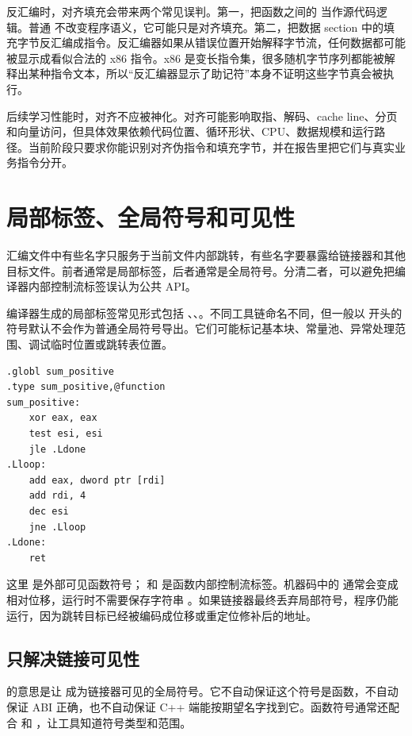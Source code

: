反汇编时，对齐填充会带来两个常见误判。第一，把函数之间的  当作源代码逻辑。普通  不改变程序语义，它可能只是对齐填充。第二，把数据 section 中的填充字节反汇编成指令。反汇编器如果从错误位置开始解释字节流，任何数据都可能被显示成看似合法的 x86 指令。x86 是变长指令集，很多随机字节序列都能被解释出某种指令文本，所以“反汇编器显示了助记符”本身不证明这些字节真会被执行。

\begin{deepdive}
后续学习性能时，对齐不应被神化。对齐可能影响取指、解码、cache line、分页和向量访问，但具体效果依赖代码位置、循环形状、CPU、数据规模和运行路径。当前阶段只要求你能识别对齐伪指令和填充字节，并在报告里把它们与真实业务指令分开。
\end{deepdive}

\section{局部标签、全局符号和可见性}

汇编文件中有些名字只服务于当前文件内部跳转，有些名字要暴露给链接器和其他目标文件。前者通常是局部标签，后者通常是全局符号。分清二者，可以避免把编译器内部控制流标签误认为公共 API。

编译器生成的局部标签常见形式包括 、、。不同工具链命名不同，但一般以  开头的符号默认不会作为普通全局符号导出。它们可能标记基本块、常量池、异常处理范围、调试临时位置或跳转表位置。

\begin{lstlisting}
.globl sum_positive
.type sum_positive,@function
sum_positive:
    xor eax, eax
    test esi, esi
    jle .Ldone
.Lloop:
    add eax, dword ptr [rdi]
    add rdi, 4
    dec esi
    jne .Lloop
.Ldone:
    ret
\end{lstlisting}

这里  是外部可见函数符号； 和  是函数内部控制流标签。机器码中的  通常会变成相对位移，运行时不需要保存字符串 。如果链接器最终丢弃局部符号，程序仍能运行，因为跳转目标已经被编码成位移或重定位修补后的地址。

\subsection{ 只解决链接可见性}

 的意思是让  成为链接器可见的全局符号。它不自动保证这个符号是函数，不自动保证 ABI 正确，也不自动保证 C++ 端能按期望名字找到它。函数符号通常还配合  和 ，让工具知道符号类型和范围。

